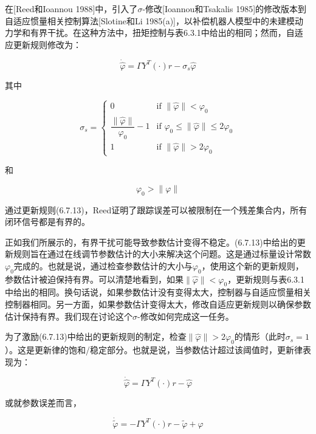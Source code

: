 \documentclass[12pt,a4paper]{ctexart}
\begin{document}
在[Reed和Ioannou 1988]中，引入了$\sigma$-修改[Ioannou和Tsakalis 1985]的修改版本到自适应惯量相关控制算法[Slotine和Li 1985(a)]，以补偿机器人模型中的未建模动力学和有界干扰。在这种方法中，扭矩控制与表6.3.1中给出的相同；然而，自适应更新规则修改为：

\begin{equation}\label{eq:6.7.13}
\dot{\hat{\varphi}} = \Gamma Y^T(\cdot)r - \sigma_s \hat{\varphi}
\end{equation}

其中

\begin{equation}\label{eq:6.7.14}
\sigma_s = \begin{cases} 0 & \text{if } \|\hat{\varphi}\| < \varphi_0 \\ \dfrac{\|\hat{\varphi}\|}{\varphi_0} - 1 & \text{if } \varphi_0 \leq \|\hat{\varphi}\| \leq 2\varphi_0 \\ 1 & \text{if } \|\hat{\varphi}\| > 2\varphi_0 \end{cases}
\end{equation}

和

\begin{equation}\label{eq:6.7.15}
\varphi_0 > \|\varphi\|
\end{equation}

通过更新规则(6.7.13)，Reed证明了跟踪误差可以被限制在一个残差集合内，所有闭环信号都是有界的。

正如我们所展示的，有界干扰可能导致参数估计变得不稳定。(6.7.13)中给出的更新规则旨在通过在线调节参数估计的大小来解决这个问题。这是通过标量设计常数$\varphi_0$完成的。也就是说，通过检查参数估计的大小与$\varphi_0$，使用这个新的更新规则，参数估计被迫保持有界。可以清楚地看到，如果$\|\hat{\varphi}\| < \varphi_0$，更新规则与表6.3.1中给出的相同。换句话说，如果参数估计没有变得太大，控制器与自适应惯量相关控制器相同。另一方面，如果参数估计变得太大，修改自适应更新规则以确保参数估计保持有界。我们现在讨论这个$\sigma$-修改如何完成这一任务。

为了激励(6.7.13)中给出的更新规则的制定，检查$\|\hat{\varphi}\| > 2\varphi_0$的情形（此时$\sigma_s=1$）。这是更新律的饱和/稳定部分。也就是说，当参数估计超过该阈值时，更新律表现为：

\begin{equation}\label{eq:6.7.16}
\dot{\hat{\varphi}} = \Gamma Y^T(\cdot)r - \hat{\varphi}
\end{equation}

或就参数误差而言，

\begin{equation}\label{eq:6.7.17}
\dot{\tilde{\varphi}} = -\Gamma Y^T(\cdot)r - \tilde{\varphi} + \varphi
\end{equation}
\end{document}
